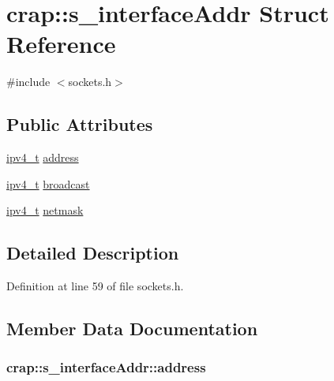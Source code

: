 \hypertarget{structcrap_1_1s__interface_addr}{}\section{crap\+:\+:s\+\_\+interface\+Addr Struct Reference}
\label{structcrap_1_1s__interface_addr}


{\ttfamily \#include $<$sockets.\+h$>$}

\subsection*{Public Attributes}
\begin{DoxyCompactItemize}
\item 
\hyperlink{namespacecrap_a9ef32279067e77955c9f269926a331ee}{ipv4\+\_\+t} \hyperlink{structcrap_1_1s__interface_addr_af622d9eb076c2d84dcf8a3c3387b1ee9}{address}
\item 
\hyperlink{namespacecrap_a9ef32279067e77955c9f269926a331ee}{ipv4\+\_\+t} \hyperlink{structcrap_1_1s__interface_addr_a7071092e57a7629be2fc579d15ee8d0b}{broadcast}
\item 
\hyperlink{namespacecrap_a9ef32279067e77955c9f269926a331ee}{ipv4\+\_\+t} \hyperlink{structcrap_1_1s__interface_addr_a2854500a375e79a86faf2230ba6b9a93}{netmask}
\end{DoxyCompactItemize}


\subsection{Detailed Description}


Definition at line 59 of file sockets.\+h.



\subsection{Member Data Documentation}
\hypertarget{structcrap_1_1s__interface_addr_af622d9eb076c2d84dcf8a3c3387b1ee9}{}
\subsubsection[{address}]{ crap\+::s\+\_\+interface\+Addr\+::address}\label{structcrap_1_1s__interface_addr_af622d9eb076c2d84dcf8a3c3387b1ee9}


